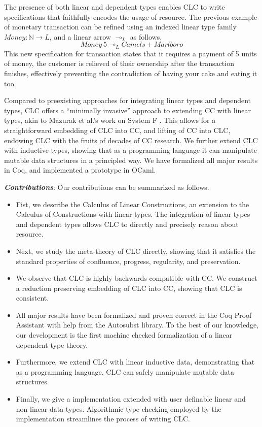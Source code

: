 \documentclass{article}
\begin{document}
  The presence of both linear and dependent types enables CLC to write specifications that faithfully encodes the usage of resource. The previous example of monetary transaction can be refined using an indexed linear type family $Money : \mathbb{N} \rightarrow L$, and a linear arrow $\multimap_L$ as follows.
  \begin{equation*}
    Money\ 5 \multimap_L Camels + Marlboro
  \end{equation*}
  This new specification for transaction states that it requires a payment of 5 units of money, the customer is relieved of their ownership after the transaction finishes, effectively preventing the contradiction of having your cake and eating it too.

  Compared to preexisting approaches for integrating linear types and dependent types, CLC offers a ``minimally invasive'' approach to extending CC with linear types, akin to Mazurak et al.'s work on System F \cite{mazurak}. This allows for a straightforward embedding of CLC into CC, and lifting of CC into CLC, endowing CLC with the fruits of decades of CC research. We further extend CLC with inductive types, showing that as a programming language it can manipulate mutable data structures in a principled way. We have formalized all major results in Coq, and implemented a prototype in OCaml. 

  \medskip

  \noindent \textbf{\textit{Contributions}}: 
  Our contributions can be summarized as follows.
  \begin{itemize}
    \item Fist, we describe the Calculus of Linear Constructions, an extension to the Calculus of Constructions with linear types. The integration of linear types and dependent types allows CLC to directly and precisely reason about resource.
    \item Next, we study the meta-theory of CLC directly, showing that it satisfies the standard properties of confluence, progress, regularity, and preservation. 
    \item We observe that CLC is highly backwards compatible with CC. We construct a reduction preserving embedding of CLC into CC, showing that CLC is consistent. 
    \item All major results have been formalized and proven correct in the Coq Proof Assistant with help from the Autosubst \cite{autosubst} library. To the best of our knowledge, our development is the first machine checked formalization of a linear dependent type theory.
    \item Furthermore, we extend CLC with linear inductive data, demonstrating that as a programming language, CLC can safely manipulate mutable data structures.
    \item Finally, we give a implementation extended with user definable linear and non-linear data types. Algorithmic type checking employed by the implementation streamlines the process of writing CLC.
  \end{itemize}
\end{document}
